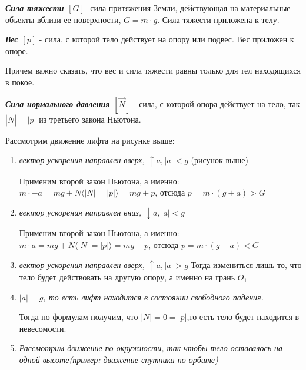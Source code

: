 \documentclass[../main.tex]{subfiles}
\begin{document}
\begin{enumerate}
           \textbf{\textit{Сила тяжести $[G]$}}- сила притяжения Земли, действующая на материальные объекты вблизи ее поверхности, $G = m \cdot g$. Сила тяжести приложена к телу.

           \textbf{\textit{Вес $[p]$}} - сила, с которой тело действует на опору или подвес. Вес приложен к опоре.

          Причем важно сказать, что вес и сила тяжести равны только для тел находящихся в покое.

           \textbf{\textit{Сила нормального давления $[\vec N]$}} - сила, с которой опора действует на тело, так $|\bar N| = | p |$ из третьего закона Ньютона.

          \vspace{5px}

          Рассмотрим движение лифта на рисунке выше:
          \begin{enumerate}
              \item \textit{вектор ускорения направлен вверх, $\uparrow a, |a| < g$}
                    (рисунок выше)

                    \vspace{5px}

                    Применим второй закон Ньютона, а именно: $m \cdot -a = mg + N \langle |N| = |p| \rangle = mg + p$, отсюда $p = m \cdot (g+a) > G $
              \item \textit{вектор ускорения направлен вниз, $\downarrow a, |a| < g$}

                    \vspace{5px}

                    Применим второй закон Ньютона, а именно: $m \cdot a = mg + N \langle |N| = |p| \rangle = mg + p$, отсюда $p = m \cdot (g-a)  <  G $
              \item \textit{вектор ускорения направлен вверх, $\uparrow a, |a| > g$}
                    Тогда измениться лишь то, что тело будет действовать на другую опору, а именно на грань $O_1$

                    \vspace{5px}

              \item \textit{$|a| = g$, то есть лифт находится в состоянии свободного падения. }

                    \vspace{5px}

                    Тогда по формулам получим, что $|N| = 0 = |p|$,то есть тело будет находится в невесомости.
              \item \textit{Рассмотрим движение по окружности, так чтобы тело оставалось на одной высоте(пример: движение спутника по орбите)}


\end{enumerate}
\end{enumerate}
\end{document}
